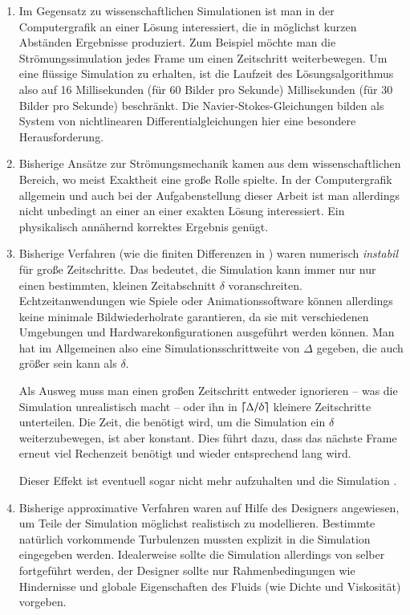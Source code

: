 \begin{enumerate}
\item
Im Gegensatz zu wissenschaftlichen Simulationen ist man in der
Computergrafik an einer Lösung interessiert, die in möglichst kurzen
Abständen Ergebnisse produziert. Zum Beispiel möchte man die
Strömungssimulation jedes Frame um einen Zeitschritt weiterbewegen. Um
eine flüssige Simulation zu erhalten, ist die Laufzeit des
Lösungsalgorithmus also auf 16 Millisekunden (für 60 Bilder pro Sekunde)
 Millisekunden (für 30 Bilder pro Sekunde) beschränkt. Die
Navier-Stokes-Gleichungen bilden als System von nichtlinearen
Differentialgleichungen hier eine besondere Herausforderung.
\item
Bisherige Ansätze zur Strömungsmechanik kamen aus dem
wissenschaftlichen Bereich, wo meist Exaktheit eine große Rolle
spielte. In der Computergrafik allgemein und auch bei der
Aufgabenstellung dieser Arbeit ist man allerdings nicht unbedingt an
einer an einer exakten Lösung interessiert.  Ein physikalisch
annähernd korrektes Ergebnis genügt.
\item
Bisherige Verfahren (wie \PimiddyzB die finiten Differenzen in
\cite{Foster1997}) waren numerisch \emph{instabil} für große
Zeitschritte. Das bedeutet, die Simulation kann immer nur nur einen
bestimmten, kleinen Zeitabschnitt $\delta$ voranschreiten.
Echtzeitanwendungen wie Spiele oder Animationssoftware können
allerdings keine minimale Bildwiederholrate garantieren, da sie mit
verschiedenen Umgebungen und Hardwarekonfigurationen ausgeführt werden
können. Man hat im Allgemeinen also eine Simulationsschrittweite von
$\Delta$ gegeben, die auch größer sein kann als $\delta$.

Als Ausweg muss man einen großen Zeitschritt entweder ignorieren --
was die Simulation unrealistisch macht -- oder ihn in
$\lceil{} \Delta / \delta \rceil{}$ kleinere Zeitschritte
unterteilen. Die Zeit, die benötigt wird, um die Simulation ein
$\delta$ weiterzubewegen, ist aber konstant. Dies führt dazu, dass das
nächste Frame erneut viel Rechenzeit benötigt und wieder entsprechend
lang wird.

Dieser Effekt ist eventuell sogar nicht mehr aufzuhalten und die
Simulation .
\item Bisherige approximative Verfahren waren auf Hilfe des Designers
angewiesen, um Teile der Simulation möglichst realistisch zu
modellieren. Bestimmte natürlich vorkommende Turbulenzen mussten
explizit in die Simulation eingegeben werden. Idealerweise sollte die
Simulation allerdings von selber fortgeführt werden, der Designer
sollte nur Rahmenbedingungen wie Hindernisse und globale Eigenschaften
des Fluids (wie Dichte und Viskosität) vorgeben.
\end{enumerate}

